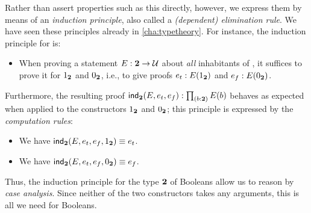 Rather than assert properties such as this directly, however, we express them by means of an \emph{induction principle}, also called a \emph{(dependent) elimination rule}.
We have seen these principles already in \autoref{cha:typetheory}.
For instance, the induction principle for \bool is:

\begin{itemize}
\item When proving a statement $E : \mathbf{2} \to \mathcal{U}$ about \emph{all} inhabitants of \bool, it suffices to prove it for ${1_{\mathbf{2}}}$ and ${0_{\mathbf{2}}}$, i.e., to give proofs $ e_t : E({1_{\mathbf{2}}})$ and $e_f : E({0_{\mathbf{2}}})$.
\end{itemize}

Furthermore, the resulting proof $\ind\two(E,e_t,e_f): \prd{b : \two}E(b)$ behaves as expected when applied to the constructors ${1_{\mathbf{2}}}$ and ${0_{\mathbf{2}}}$; this principle is expressed by the \emph{computation rules}:
\begin{itemize}
\item We have $\mathsf{ind}_{\mathbf{2}}(E,e_t,e_f,{1_{\mathbf{2}}}) \equiv e_t$.
\item We have $\mathsf{ind}_{\mathbf{2}}(E,e_t,e_f,{0_{\mathbf{2}}}) \equiv e_f$.
\end{itemize}

Thus, the induction principle for the type $\mathbf{2}$ of Booleans allow us to reason by \emph{case analysis}.
Since neither of the two constructors takes any arguments, this is all we need for Booleans.


